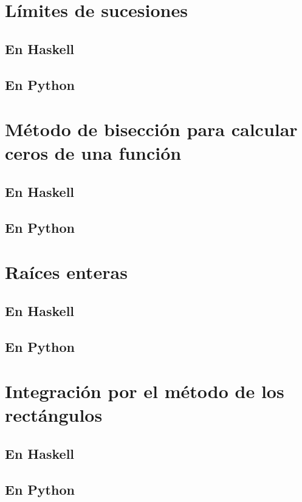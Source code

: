 \documentclass[a4paper,12pt,twoside]{book}
\begin{document}
\section{Límites de sucesiones}
\subsection{En Haskell}
\subsection{En Python}

\section{Método de bisección para calcular ceros de una función}
\subsection{En Haskell}
\subsection{En Python}

\section{Raíces enteras}
\subsection{En Haskell}
\subsection{En Python}

\section{Integración por el método de los rectángulos}
\subsection{En Haskell}
\subsection{En Python}
\end{document}
